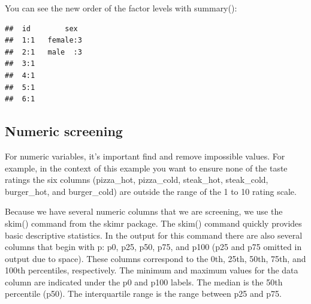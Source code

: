 \documentclass[
]{krantz}
\makeatletter
\newenvironment{Shaded}{\begin{snugshade}}{\end{snugshade}}
\newcommand{\KeywordTok}[1]{\textcolor[rgb]{0.27,0.27,0.27}{\textbf{#1}}}
\newcommand{\NormalTok}[1]{#1}
\newcommand{\OperatorTok}[1]{\textcolor[rgb]{0.43,0.43,0.43}{\textbf{#1}}}
\newcommand{\StringTok}[1]{\textcolor[rgb]{0.5,0.5,0.5}{#1}}
\newenvironment{kframe}{%
\medskip{}
\setlength{\fboxsep}{.8em}
 \def\at@end@of@kframe{}%
 \ifinner\ifhmode%
  \def\at@end@of@kframe{\end{minipage}}%
  \begin{minipage}{\columnwidth}%
 \fi\fi%
 \def\FrameCommand##1{\hskip\@totalleftmargin \hskip-\fboxsep
 \colorbox{shadecolor}{##1}\hskip-\fboxsep
     \hskip-\linewidth \hskip-\@totalleftmargin \hskip\columnwidth}%
 \MakeFramed {\advance\hsize-\width
   \@totalleftmargin\z@ \linewidth\hsize
   \@setminipage}}%
 {\par\unskip\endMakeFramed%
 \at@end@of@kframe}
\renewenvironment{Shaded}{\begin{kframe}}{\end{kframe}}
\makeatother
\begin{document}
You can see the new order of the factor levels with summary():

\begin{Shaded}
\end{Shaded}

\begin{verbatim}
##  id        sex   
##  1:1   female:3  
##  2:1   male  :3  
##  3:1             
##  4:1             
##  5:1             
##  6:1
\end{verbatim}

\hypertarget{numeric-screening-2}{%
\subsection{Numeric screening}\label{numeric-screening-2}}

For numeric variables, it's important find and remove impossible values. For example, in the context of this example you want to ensure none of the taste ratings the six columns (pizza\_hot, pizza\_cold, steak\_hot, steak\_cold, burger\_hot, and burger\_cold) are outside the range of the 1 to 10 rating scale.

Because we have several numeric columns that we are screening, we use the skim() command from the skimr package. The skim() command quickly provides basic descriptive statistics. In the output for this command there are also several columns that begin with p: p0, p25, p50, p75, and p100 (p25 and p75 omitted in output due to space). These columns correspond to the 0th, 25th, 50th, 75th, and 100th percentiles, respectively. The minimum and maximum values for the data column are indicated under the p0 and p100 labels. The median is the 50th percentile (p50). The interquartile range is the range between p25 and p75.

\begin{Shaded}
\end{Shaded}
\end{document}
